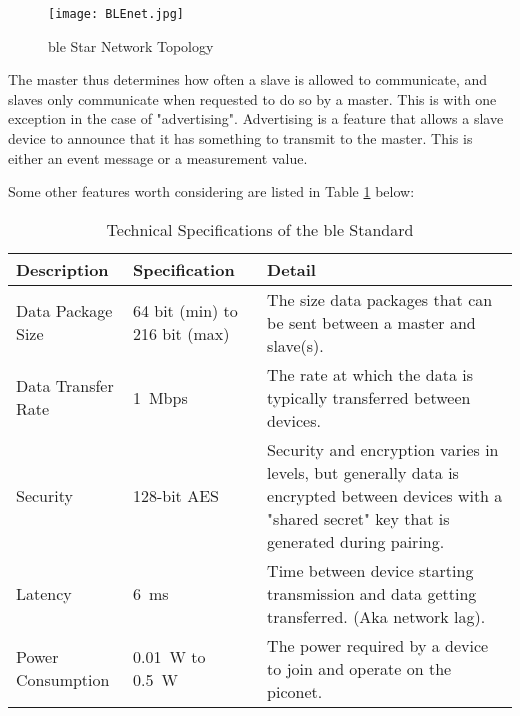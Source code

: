 \begin{figure}[h!]
	\begin{center}
		\texttt{[image: BLEnet.jpg]}
		\caption{\ac{ble} Star Network Topology}
		\label{fig:ble}
	\end{center}
\end{figure}

The master thus determines how often a slave is allowed to communicate, and slaves only communicate when requested to do so by a master. This is with one exception in the case of "advertising". Advertising is a feature that allows a slave device to announce that it has something to transmit to the master. This is either an event message or a measurement value.
\newpage

Some other features worth considering are listed in Table \ref{tab:ble} below:

\begin{table}[h!]
		\renewcommand{\arraystretch}{1.5}
	\centering
	\caption{Technical Specifications of the \ac{ble} Standard}
	\begin{tabularx}{\textwidth}{>{\raggedright}p{2.5cm} >{\raggedright}p{3cm} >{\raggedright\arraybackslash}X}
		\toprule
		Description        & Specification                       & Detail                                                                                                                                                 \\
		\midrule
		Data Package Size  & 64 bit (min) to 216 bit (max)       & The size data packages that can be sent between a master and slave(s).                                                                                 \\
		Data Transfer Rate & \SI{1}{Mbps}                        & The rate at which the data is typically transferred between devices.                                                                                   \\
		Security           & 128-bit AES                         & Security and encryption varies in levels, but generally data is encrypted between devices with a "shared secret" key that is generated during pairing. \\
		Latency            & \SI{6}{\milli\second}               & Time between device starting transmission and data getting transferred. (Aka network lag).                                                             \\
		Power Consumption  & \SI{0.01}{\watt} to \SI{0.5}{\watt} & The power required by a device to join and operate on the piconet.                                                                                     \\
		\bottomrule
	\end{tabularx}
	\label{tab:ble}
\end{table}

